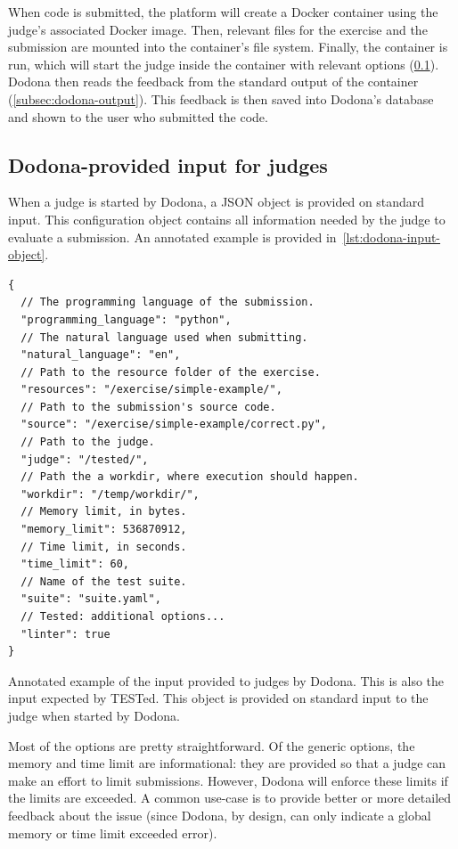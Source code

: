 \documentclass[../main]{subfiles}
\begin{document}
When code is submitted, the platform will create a Docker container using the judge's associated Docker image.
Then, relevant files for the exercise and the submission are mounted into the container's file system.
Finally, the container is run, which will start the judge inside the container with relevant options (\cref{subsec:dodona-input}).
Dodona then reads the feedback from the standard output of the container (\cref{subsec:dodona-output}).
This feedback is then saved into Dodona's database and shown to the user who submitted the code.

\subsection{Dodona-provided input for judges}\label{subsec:dodona-input}

When a judge is started by Dodona, a JSON object is provided on standard input.
This configuration object contains all information needed by the judge to evaluate a submission.
An annotated example is provided in~\cref{lst:dodona-input-object}.

\begin{listing}
    \begin{verbatim}
{
  // The programming language of the submission.
  "programming_language": "python",
  // The natural language used when submitting.
  "natural_language": "en",
  // Path to the resource folder of the exercise.
  "resources": "/exercise/simple-example/",
  // Path to the submission's source code.
  "source": "/exercise/simple-example/correct.py",
  // Path to the judge.
  "judge": "/tested/",
  // Path the a workdir, where execution should happen.
  "workdir": "/temp/workdir/",
  // Memory limit, in bytes.
  "memory_limit": 536870912,
  // Time limit, in seconds.
  "time_limit": 60,
  // Name of the test suite.
  "suite": "suite.yaml",
  // Tested: additional options...
  "linter": true
}
    \end{verbatim}
    \caption{
        Annotated example of the input provided to judges by Dodona.
        This is also the input expected by TESTed.
        This object is provided on standard input to the judge when started by Dodona.
    }
    \label{lst:dodona-input-object}
\end{listing}

Most of the options are pretty straightforward.
Of the generic options, the memory and time limit are informational: they are provided so that a judge can make an effort to limit submissions.
However, Dodona will enforce these limits if the limits are exceeded.
A common use-case is to provide better or more detailed feedback about the issue (since Dodona, by design, can only indicate a global memory or time limit exceeded error).
\end{document}

